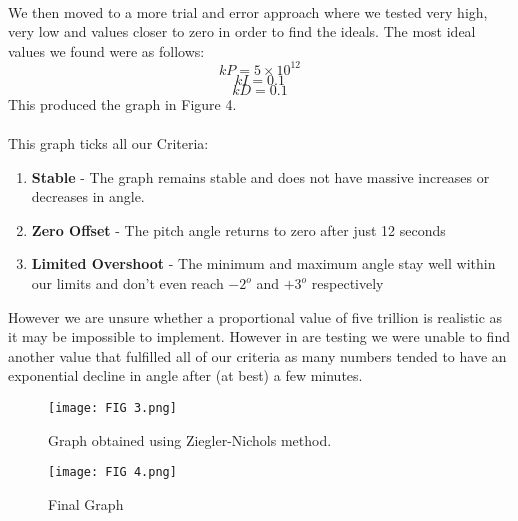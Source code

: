 \documentclass{article}
\numberwithin{equation}{section}
\begin{document}
\newpage
\[\]\\
We then moved to a more trial and error approach where we tested very high, very low and values closer to zero in order to find the ideals.
The most ideal values we found were as follows:\\
\[kP = 5\times10^{12}\]
\[kI = 0.1\]
\[kD = 0.1\]
This produced the graph in Figure 4.\\\\
This graph ticks all our Criteria:
\begin{enumerate}
\item [\checkmark] \textbf{Stable} - The graph remains stable and does not have massive increases or decreases in angle. 
\item [\checkmark] \textbf{Zero Offset} - The pitch angle returns to zero after just 12 seconds
\item [\checkmark] \textbf{Limited Overshoot} - The minimum and maximum angle stay well within our limits and don't even reach \(-2^o\) and \(+3^o\) respectively  
\end{enumerate}
%
However we are unsure whether a proportional value of five trillion is realistic as it may be impossible to implement. However in are testing we were unable to find another value that fulfilled all of our criteria as many numbers tended to have an exponential decline in angle after (at best) a few minutes.

\begin{figure}
    \centering
    \texttt{[image: FIG 3.png]}
    \caption{Graph obtained using Ziegler-Nichols method.}
    \label{fig:enter-label}
\end{figure}
\begin{figure}
    \centering
    \texttt{[image: FIG 4.png]}
    \caption{Final Graph}
    \label{fig:enter-label}
\end{figure}
\newpage
\end{document}

